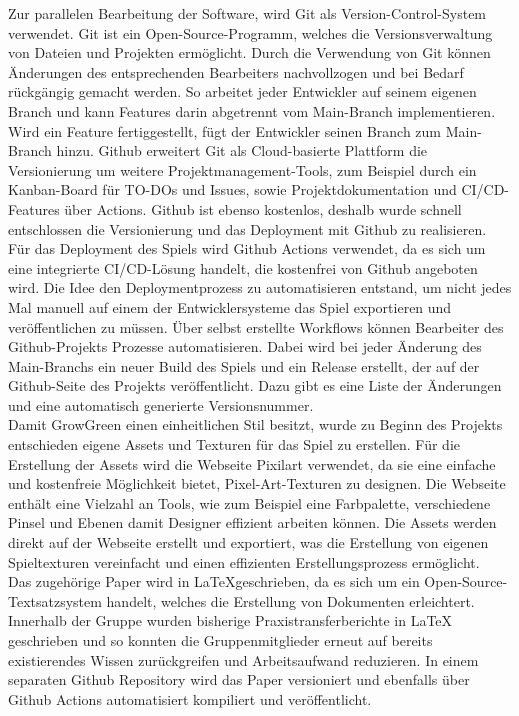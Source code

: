 \newpage
Zur parallelen Bearbeitung der Software, wird Git als Version-Control-System verwendet.
Git ist ein Open-Source-Programm, welches die Versionsverwaltung von Dateien und Projekten ermöglicht.
Durch die Verwendung von Git können Änderungen des entsprechenden Bearbeiters nachvollzogen und bei Bedarf rückgängig 
gemacht werden.
So arbeitet jeder Entwickler auf seinem eigenen Branch und kann Features darin abgetrennt vom Main-Branch 
implementieren.
Wird ein Feature fertiggestellt, fügt der Entwickler seinen Branch zum Main-Branch hinzu.
Github erweitert Git als Cloud-basierte Plattform die Versionierung um weitere Projektmanagement-Tools, zum
Beispiel durch ein Kanban-Board für TO-DOs und Issues, sowie Projektdokumentation und CI/CD-Features über Actions. 
Github ist ebenso kostenlos, deshalb wurde schnell entschlossen die Versionierung und das Deployment mit Github
zu realisieren.\\
\newline
Für das Deployment des Spiels wird Github Actions verwendet, da es sich um eine integrierte CI/CD-Lösung handelt, die
kostenfrei von Github angeboten wird.
Die Idee den Deploymentprozess zu automatisieren entstand, um nicht jedes Mal manuell auf einem der 
Entwicklersysteme das Spiel exportieren und veröffentlichen zu müssen.
Über selbst erstellte Workflows können Bearbeiter des Github-Projekts Prozesse automatisieren.
Dabei wird bei jeder Änderung des Main-Branchs ein neuer Build des Spiels und ein Release erstellt, der auf der Github-Seite des Projekts veröffentlicht.
Dazu gibt es eine Liste der 
Änderungen und eine automatisch generierte Versionsnummer.\\
\newline
Damit GrowGreen einen einheitlichen Stil besitzt, wurde zu Beginn des Projekts entschieden eigene
Assets und Texturen für das Spiel zu erstellen.
Für die Erstellung der Assets wird die Webseite Pixilart verwendet, da sie eine einfache und kostenfreie Möglichkeit
bietet, Pixel-Art-Texturen zu designen.
Die Webseite enthält eine Vielzahl an Tools, wie zum Beispiel eine Farbpalette, verschiedene
Pinsel und Ebenen damit Designer effizient arbeiten können.
Die Assets werden direkt auf der Webseite erstellt und exportiert, was die Erstellung von eigenen
Spieltexturen vereinfacht und einen effizienten Erstellungsprozess ermöglicht.\\
\newline
Das zugehörige Paper wird in \LaTeX{}geschrieben, da es sich um ein Open-Source-Textsatzsystem handelt, welches die
Erstellung von Dokumenten erleichtert.
Innerhalb der Gruppe wurden bisherige Praxistransferberichte in \LaTeX{} geschrieben und so 
konnten die Gruppenmitglieder erneut auf bereits existierendes Wissen zurückgreifen und Arbeitsaufwand reduzieren.
In einem separaten Github Repository wird das Paper versioniert und ebenfalls über Github Actions automatisiert 
kompiliert und veröffentlicht.